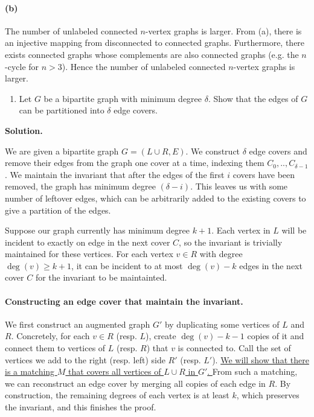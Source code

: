 \documentclass[11pt,letterpaper]{article}
\theoremstyle{definition}
\newcommand{\solution}{\medskip\noindent\textbf{Solution.}\par\medskip}
\begin{document}
\paragraph{(b)}
The number of unlabeled connected $n$-vertex graphs is larger. 
From (a), there is an injective mapping from disconnected to connected graphs. 
Furthermore, there exists connected graphs whose complements are also connected graphs (e.g. the $n$-cycle for $n>3$).
Hence the number of unlabeled connected $n$-vertex graphs is larger.

\begin{enumerate}[resume]
\item[10.**] Let $G$ be a bipartite graph with minimum degree $\delta$. Show that the edges of $G$ can be partitioned into $\delta$ edge covers.
\end{enumerate}

\solution
We are given a bipartite graph $G= (L\cup R,E)$.
We construct $\delta$ edge covers and remove their edges from the graph one cover at a time, indexing them $C_0, .., C_{\delta-1}$.
We maintain the invariant that after the edges of the first $i$ covers have been removed, the graph has minimum degree $(\delta-i)$.
This leaves us with some number of leftover edges, which can be arbitrarily added to the existing covers to give a partition of the edges.

Suppose our graph currently has minimum degree $k+1$. 
Each vertex in $L$ will be incident to exactly on edge in the next cover $C$, so the invariant is trivially maintained for these vertices.
For each vertex $v\in R$ with degree $\deg(v)\geq k+1$, it can be incident to at most $\deg(v)-k$ edges in the next cover $C$ for the invariant to be maintainted.

\paragraph{Constructing an edge cover that maintain the invariant.}

We first construct an augmented graph $G'$ by duplicating some vertices of $L$ and $R$. 
Concretely, for each $v\in R$ (resp. $L$), create $\deg(v)-k-1$ copies of it and connect them to vertices of $L$ (resp. $R$) that $v$ is connected to. 
Call the set of vertices we add to the right (resp. left) side $R'$ (resp. $L'$).
\ul{We will show that there is a matching $M$ that covers all vertices of $L\cup R$ in $G'$. }
From such a matching, we can reconstruct an edge cover by merging all copies of each edge in $R$.
By construction, the remaining degrees of each vertex is at least $k$, which preserves the invariant, and this finishes the proof.
\end{document}
